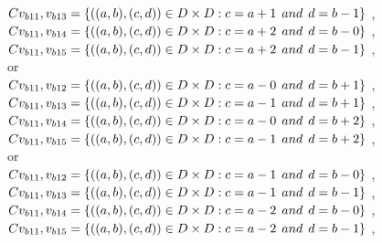 \\$C{v_{b11},v_{b13}}=\{((a,b),(c,d))\in D\times D: c = a + 1\hspace{1ex} and \hspace{1ex}  d = b - 1 \}$ , 
\\$C{v_{b11},v_{b14}}=\{((a,b),(c,d))\in D\times D: c = a + 2\hspace{1ex} and \hspace{1ex}  d = b - 0 \}$ , 
\\$C{v_{b11},v_{b15}}=\{((a,b),(c,d))\in D\times D: c = a + 2\hspace{1ex} and \hspace{1ex}  d = b - 1 \}$ , 
\\or
\\$C{v_{b11},v_{b12}}=\{((a,b),(c,d))\in D\times D: c = a - 0\hspace{1ex} and \hspace{1ex}  d = b + 1 \}$ , 
\\$C{v_{b11},v_{b13}}=\{((a,b),(c,d))\in D\times D: c = a - 1\hspace{1ex} and \hspace{1ex}  d = b + 1 \}$ , 
\\$C{v_{b11},v_{b14}}=\{((a,b),(c,d))\in D\times D: c = a - 0\hspace{1ex} and \hspace{1ex}  d = b + 2 \}$ , 
\\$C{v_{b11},v_{b15}}=\{((a,b),(c,d))\in D\times D: c = a - 1\hspace{1ex} and \hspace{1ex}  d = b + 2 \}$ , 
\\or
\\$C{v_{b11},v_{b12}}=\{((a,b),(c,d))\in D\times D: c = a - 1\hspace{1ex} and \hspace{1ex}  d = b - 0 \}$ , 
\\$C{v_{b11},v_{b13}}=\{((a,b),(c,d))\in D\times D: c = a - 1\hspace{1ex} and \hspace{1ex}  d = b - 1 \}$ , 
\\$C{v_{b11},v_{b14}}=\{((a,b),(c,d))\in D\times D: c = a - 2\hspace{1ex} and \hspace{1ex}  d = b - 0 \}$ , 
\\$C{v_{b11},v_{b15}}=\{((a,b),(c,d))\in D\times D: c = a - 2\hspace{1ex} and \hspace{1ex}  d = b - 1 \}$ , 
